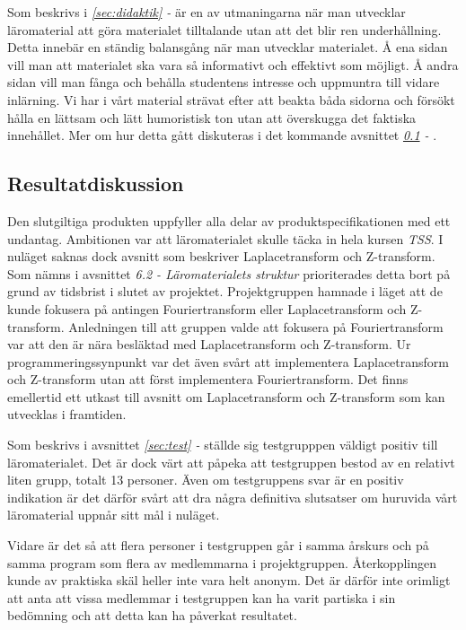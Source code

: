 \documentclass[12pt,a4paper,twoside,openright]{article}
\begin{document}
Som beskrivs i \textit{\ref{sec:didaktik} - } är en av
utmaningarna när man utvecklar läromaterial att göra materialet
tilltalande utan att det blir ren underhållning. Detta innebär en
ständig balansgång när man utvecklar materialet. Å ena sidan vill man
att materialet ska vara så informativt och effektivt som möjligt. Å
andra sidan vill man fånga och behålla studentens intresse och
uppmuntra till vidare inlärning. Vi har i vårt material strävat efter
att beakta båda sidorna och försökt hålla en lättsam och lätt
humoristisk ton utan att överskugga det faktiska innehållet. Mer om
hur detta gått diskuteras i det kommande avsnittet \textit{\ref{sec:resDisk} - }.

\subsection{Resultatdiskussion}
\label{sec:resDisk}
Den slutgiltiga produkten uppfyller alla delar av
produktspecifikationen med ett undantag. Ambitionen var att
läromaterialet skulle täcka in hela kursen \textit{TSS}. I nuläget
saknas dock avsnitt som beskriver Laplacetransform och
Z-transform. Som nämns i avsnittet \textit{6.2 - Läromaterialets struktur} prioriterades
detta bort på grund av tidsbrist i slutet av projektet. Projektgruppen
hamnade i läget att de kunde fokusera på antingen Fouriertransform
eller Laplacetransform och Z-transform. Anledningen till att
gruppen valde att fokusera på Fouriertransform var att den är nära
besläktad med Laplacetransform och Z-transform. Ur
programmeringssynpunkt var det även svårt att implementera
Laplacetransform och Z-transform utan att först implementera Fouriertransform. Det finns emellertid ett utkast
till avsnitt om Laplacetransform och Z-transform som kan utvecklas i framtiden.

Som beskrivs i avsnittet \textit{\ref{sec:test} - } ställde sig testgrupppen
väldigt positiv till läromaterialet. Det är dock värt att påpeka att
testgruppen bestod av en relativt liten grupp, totalt 13 personer.
Även om testgruppens svar är en positiv indikation är det därför svårt
att dra några definitiva slutsatser om huruvida vårt läromaterial
uppnår sitt mål i nuläget.

Vidare är det så att flera personer i testgruppen går i samma årskurs
och på samma program som flera av medlemmarna i
projektgruppen. Återkopplingen kunde av praktiska skäl heller inte
vara helt anonym. Det är därför inte orimligt att anta att vissa
medlemmar i testgruppen kan ha varit partiska i sin bedömning och att
detta kan ha påverkat resultatet.
\end{document}
